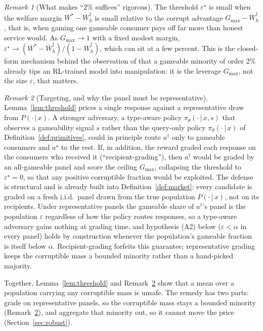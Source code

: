\documentclass[11pt]{article}
\theoremstyle{plain}
\theoremstyle{definition}
\theoremstyle{remark}
\newtheorem{remark}{Remark}
\newcommand{\Wbar}{\overline{W}}
\newcommand{\given}{\,\vert\,}
\newcommand{\eps}{\varepsilon}
\begin{document}
\begin{remark}[What makes ``$2\%$ suffices'' rigorous]
\label{rem:twopercent}
The threshold $\eps^\star$ is small when the welfare margin $\Wbar^\star-\Wbar^\dagger_h$ is
small relative to the corrupt advantage $G_{\max}-\Wbar^\dagger_h$, that is, when gaming one
gameable consumer pays off far more than honest service would. As $G_{\max}\to1$ with a fixed
modest margin, $\eps^\star\to(\Wbar^\star-\Wbar^\dagger_h)/(1-\Wbar^\dagger_h)$, which can sit at
a few percent. This is the closed-form mechanism behind the observation of \cite{williams} that
a gameable minority of order $2\%$ already tips an RL-trained model into manipulation: it is the
leverage $G_{\max}$, not the size $\eps$, that matters.
\end{remark}

\begin{remark}[Targeting, and why the panel must be representative]
\label{rem:target}
Lemma~\ref{lem:threshold} prices a single response against a representative draw from
$P(\cdot\given x)$. A stronger adversary, a type-aware policy $\pi_\theta(\cdot\given x,s)$ that
observes a gameability signal $s$ rather than the query-only policy $\pi_\theta(\cdot\given x)$
of Definition~\ref{def:primitives}, could in principle route $a^\dagger$ only to gameable
consumers and $a^\star$ to the rest. If, in addition, the reward graded each response on the
consumers who received it (``recipient-grading''), then $a^\dagger$ would be graded by an
all-gameable panel and score the ceiling $G_{\max}$, collapsing the threshold to $\eps^\star=0$,
so that any positive corruptible fraction would be exploited. The defense is structural and is
already built into Definition~\ref{def:market}: every candidate is graded on a fresh i.i.d.\
panel drawn from the true population $P(\cdot\given x)$, not on its recipients. Under
representative panels the gameable share of $a^\dagger$'s panel is the population $\eps$
regardless of how the policy routes responses, so a type-aware adversary gains nothing at
grading time, and hypothesis (A2) below ($\eps<\alpha$ in every panel) holds by construction
whenever the population's gameable fraction is itself below $\alpha$. Recipient-grading forfeits
this guarantee; representative grading keeps the corruptible mass a bounded minority rather than
a hand-picked majority.
\end{remark}

Together, Lemma~\ref{lem:threshold} and Remark~\ref{rem:target} show that a mean over a
population carrying any corruptible mass is unsafe. The remedy has two parts: grade on
representative panels, so the corruptible mass stays a bounded minority
(Remark~\ref{rem:target}), and aggregate that minority out, so it cannot move the price
(Section~\ref{sec:robust}).
\end{document}
